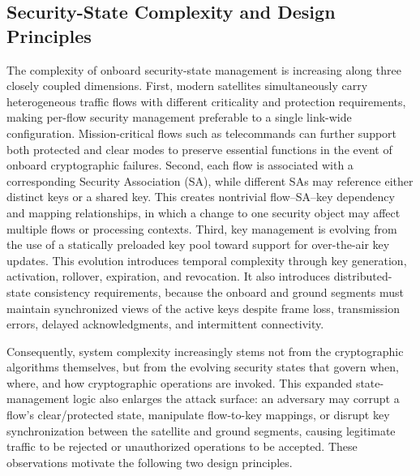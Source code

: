 \documentclass[journal]{IEEEtran}
\begin{document}
\subsection{Security-State Complexity and Design Principles} 
\label{subsec:point1-Drivers}
The complexity of onboard security-state management is increasing along three closely coupled dimensions. 
First, modern satellites simultaneously carry heterogeneous traffic flows with different criticality and protection requirements, making per-flow security management preferable to a single link-wide configuration. Mission-critical flows such as telecommands can further support both protected and clear modes \cite{huang2026toward} to preserve essential functions in the event of onboard cryptographic failures. 
Second, each flow is associated with a corresponding Security Association (SA), while different SAs may reference either distinct keys or a shared key. This creates nontrivial flow–SA–key dependency and mapping relationships, in which a change to one security object may affect multiple flows or processing contexts. 
Third, key management is evolving from the use of a statically preloaded key pool toward support for over-the-air key updates. This evolution introduces temporal complexity through key generation, activation, rollover, expiration, and revocation. It also introduces distributed-state consistency requirements, because the onboard and ground segments must maintain synchronized views of the active keys despite frame loss, transmission errors, delayed acknowledgments, and intermittent connectivity. 

Consequently, system complexity increasingly stems not from the cryptographic algorithms themselves, but from the evolving security states that govern when, where, and how cryptographic operations are invoked. 
This expanded state-management logic also enlarges the attack surface: an adversary may corrupt a flow’s clear/protected state, manipulate flow-to-key mappings, or disrupt key synchronization between the satellite and ground segments, causing legitimate traffic to be rejected or unauthorized operations to be accepted. 
These observations motivate the following two design principles. 
\end{document}
